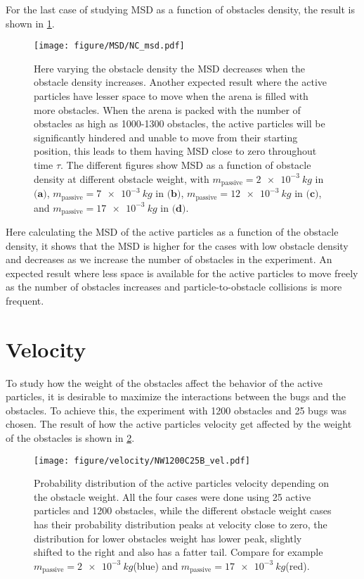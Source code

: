 For the last case of studying MSD as a function of obstacles density, the result is shown in 
\cref{fig:msd_NC}.

\begin{figure}[htbp]
    \centering
    \texttt{[image: figure/MSD/NC\_msd.pdf]}
    \caption{Here varying the obstacle density the MSD decreases when the obstacle density increases. 
    Another expected result where the active particles have lesser space to move when the arena is 
    filled with more obstacles. When the arena is packed with the number of obstacles as high as 
    1000-1300 obstacles, the active particles will be significantly hindered and unable to move 
    from their starting position, this leads to them having MSD close to zero throughout time $\tau$. 
    The different figures show MSD as a function of obstacle density at different obstacle weight, 
    with $m_{\text{passive}}=\SI{2e-3}{kg}$ in $\textbf{(a)}$, 
    $m_{\text{passive}}=\SI{7e-3}{kg}$ in $\textbf{(b)}$, 
    $m_{\text{passive}}=\SI{12e-3}{kg}$ in $\textbf{(c)}$, 
    and $m_{\text{passive}}=\SI{17e-3}{kg}$ in $\textbf{(d)}$.} 
    \label{fig:msd_NC}
\end{figure}

Here calculating the MSD of the active particles as a function of 
the obstacle density, it shows that the MSD is higher for the cases with low obstacle density and 
decreases as we increase the number of obstacles in the experiment. An expected result 
where less space is available for the active particles to move freely as the number 
of obstacles increases and particle-to-obstacle collisions is more frequent.

\section{Velocity}
To study how the weight of the obstacles affect the behavior of the active particles, 
it is desirable to maximize the interactions between the bugs and the obstacles. 
To achieve this, the experiment with 1200 obstacles and 25 bugs was chosen. The result 
of how the active particles velocity get affected by the weight of the obstacles is shown in 
\cref{fig:velkde_NW1200C25B}.

\begin{figure}[htpb]
    \centering
    \texttt{[image: figure/velocity/NW1200C25B\_vel.pdf]}
    \caption{Probability distribution of the active particles velocity depending on the 
    obstacle weight. All the four cases were done using 25 active 
    particles and 1200 obstacles, while the different obstacle weight cases has their 
    probability distribution peaks at velocity close to zero, the distribution for lower 
    obstacles weight has lower peak, slightly shifted to the right and also has a fatter tail. 
    Compare for example $m_{\text{passive}}=\SI{2e-3}{kg}$(blue) and $m_{\text{passive}}=\SI{17e-3}{kg}$(red).}
    \label{fig:velkde_NW1200C25B}
\end{figure}

